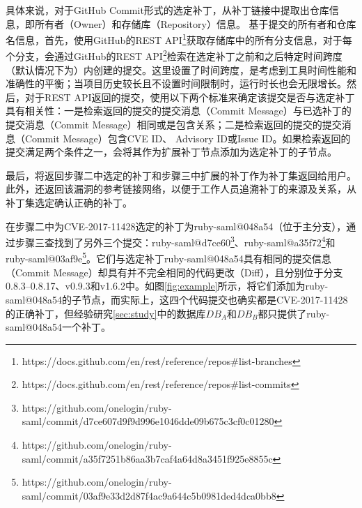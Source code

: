 具体来说，对于GitHub Commit形式的选定补丁，\tool 从补丁链接中提取出仓库信息，即所有者（Owner）和存储库（Repository）信息。
基于提交的所有者和仓库名信息，首先，\tool 使用GitHub的REST API\footnote{https://docs.github.com/en/rest/reference/repos\#list-branches}获取存储库中的所有分支信息，对于每个分支，\tool 会通过GitHub的REST API\footnote{https://docs.github.com/en/rest/reference/repos\#list-commits}检索在选定补丁之前和之后特定时间跨度（默认情况下为）内创建的提交。这里设置了时间跨度，是考虑到工具时间性能和准确性的平衡；当项目历史较长且不设置时间限制时，\tool 运行时长也会无限增长。然后，对于REST API返回的提交，\tool 使用以下两个标准来确定该提交是否与选定补丁具有相关性：一是检索返回的提交的提交消息（Commit Message）与已选补丁的提交消息（Commit Message）相同或是包含关系；二是检索返回的提交的提交消息（Commit Message）包含CVE ID、 Advisory ID或Issue ID。如果检索返回的提交满足两个条件之一，\tool 会将其作为扩展补丁节点添加为选定补丁的子节点。

最后，\tool 将返回步骤二中选定的补丁和步骤三中扩展的补丁作为补丁集返回给用户。此外，\tool 还返回该漏洞的参考链接网络，以便于工作人员追溯补丁的来源及关系，从补丁集选定确认正确的补丁。


\begin{exmp}
在步骤二中为CVE-2017-11428选定的补丁为ruby-saml@048a54（位于主分支），\tool 通过步骤三查找到了另外三个提交：ruby-saml@d7ce60\footnote{https://github.com/onelogin/ruby-saml/commit/d7ce607d9f9d996e1046dde09b675c3cf0c01280}、ruby-saml@a35f72\footnote{https://github.com/onelogin/ruby-saml/commit/a35f7251b86aa3b7caf4a64d8a3451f925e8855c}和ruby-saml@03af9e\footnote{https://github.com/onelogin/ruby-saml/commit/03af9e33d2d87f4ac9a644c5b0981ded4dca0bb8}。它们与选定补丁ruby-saml@048a54具有相同的提交信息（Commit Message）却具有并不完全相同的代码更改（Diff），且分别位于分支0.8.3--0.8.17、v0.9.3和v1.6.2中。如图\ref{fig:example}所示，\tool 将它们添加为ruby-saml@048a54的子节点，而实际上，这四个代码提交也确实都是CVE-2017-11428的正确补丁，但经验研究\ref{sec:study}中的数据库$DB_A$和$DB_B$都只提供了ruby-saml@048a54一个补丁。
\end{exmp}